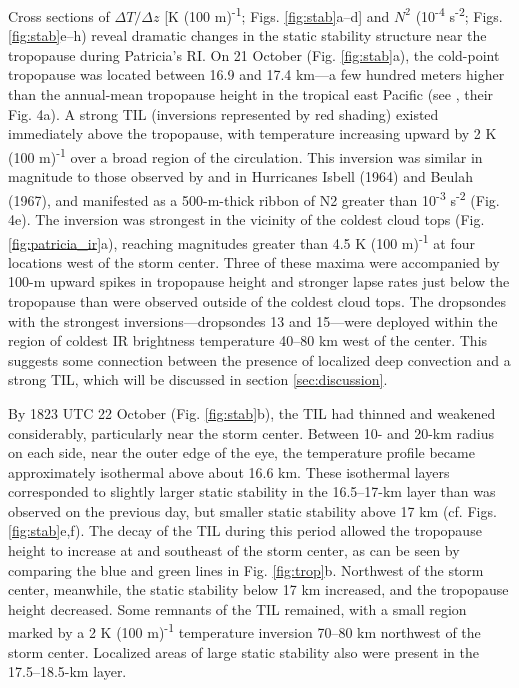 Cross sections of $\Delta T/\Delta z$ [K (100 m)\textsuperscript{-1}; Figs. \ref{fig:stab}a–d] and $N^2$ (10\textsuperscript{-4} s\textsuperscript{-2}; Figs. \ref{fig:stab}e–h) reveal dramatic changes in the static stability structure near the tropopause during Patricia’s RI.
On 21 October (Fig. \ref{fig:stab}a), the cold-point tropopause was located between 16.9 and 17.4 km---a few hundred meters higher than the annual-mean tropopause height in the tropical east Pacific (see \citeauthor{Seideletal2001} \citeyear{Seideletal2001}, their Fig. 4a).
A strong TIL (inversions represented by red shading) existed immediately above the tropopause, with temperature increasing upward by 2 K (100 m)\textsuperscript{-1} over a broad region of the circulation.
This inversion was similar in magnitude to those observed by \cite{Gentry1967} and \cite{Waco1970} in Hurricanes Isbell (1964) and Beulah (1967), and manifested as a 500-m-thick ribbon of N2 greater than 10\textsuperscript{-3} s\textsuperscript{-2} (Fig. 4e).
The inversion was strongest in the vicinity of the coldest cloud tops (Fig. \ref{fig:patricia_ir}a), reaching magnitudes greater than 4.5 K (100 m)\textsuperscript{-1} at four locations west of the storm center.
Three of these maxima were accompanied by 100-m upward spikes in tropopause height and stronger lapse rates just below the tropopause than were observed outside of the coldest cloud tops.
The dropsondes with the strongest inversions---dropsondes 13 and 15---were deployed within the region of coldest IR brightness temperature 40–80 km west of the center.
This suggests some connection between the presence of localized deep convection and a strong TIL, which will be discussed in section \ref{sec:discussion}.

By 1823 UTC 22 October (Fig. \ref{fig:stab}b), the TIL had thinned and weakened considerably, particularly near the storm center.
Between 10- and 20-km radius on each side, near the outer edge of the eye, the temperature profile became approximately isothermal above about 16.6 km.
These isothermal layers corresponded to slightly larger static stability in the 16.5–17-km layer than was observed on the previous day, but smaller static stability above 17 km (cf. Figs. \ref{fig:stab}e,f).
The decay of the TIL during this period allowed the tropopause height to increase at and southeast of the storm center, as can be seen by comparing the blue and green lines in Fig. \ref{fig:trop}b.
Northwest of the storm center, meanwhile, the static stability below 17 km increased, and the tropopause height decreased. Some remnants of the TIL remained, with a small region marked by a 2 K (100 m)\textsuperscript{-1} temperature inversion 70–80 km northwest of the storm center.
Localized areas of large static stability also were present in the 17.5–18.5-km layer.

